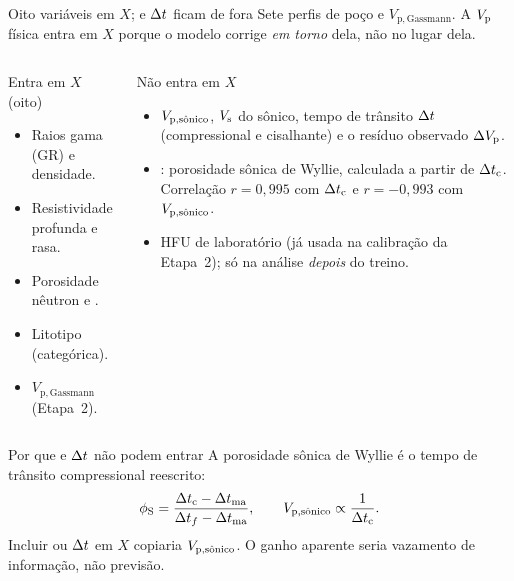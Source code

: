 \documentclass[aspectratio=169,10pt]{beamer}
\begin{document}
\begin{frame}[shrink=8]{Oito variáveis em $X$; \phiS{} e $\Dt$ ficam de fora}
  \footnotesize
  Sete perfis de poço e $V_{\mathrm{p,Gassmann}}$. A $\Vp$ física entra em $X$
  porque o modelo corrige \emph{em torno} dela, não no lugar dela.
  \vspace{0.06cm}
  \begin{columns}[T,onlytextwidth]
    \begin{block}{Entra em $X$ (oito)}
      \scriptsize
      \begin{itemize}
        \item Raios gama (GR) e densidade.
        \item Resistividade profunda e rasa.
        \item Porosidade nêutron e \phiND{}.
        \item Litotipo (categórica).
        \item $V_{\mathrm{p,Gassmann}}$ (Etapa~2).
      \end{itemize}
    \end{block}
    \begin{exampleblock}{Não entra em $X$}
      \scriptsize
      \begin{itemize}
        \item $\Vpsonsub$, $\Vs$ do sônico, tempo de trânsito $\Dt$
              (compressional e cisalhante) e o resíduo observado $\dVp$.
        \item \textbf{\phiS{}}: porosidade sônica de Wyllie, calculada a
              partir de $\Dtc$. Correlação $r = 0{,}995$ com $\Dtc$ e
              $r = -0{,}993$ com $\Vpsonsub$.
        \item HFU de laboratório (já usada na calibração da Etapa~2);
              só na análise \emph{depois} do treino.
      \end{itemize}
    \end{exampleblock}
  \end{columns}
  \vspace{0.08cm}
  \begin{block}{Por que \phiS{} e $\Dt$ não podem entrar}
    \scriptsize
    A porosidade sônica de Wyllie é o tempo de trânsito compressional
    reescrito:
    \[
      \phiS
      = \frac{\Dtc - \Delta t_{\mathrm{ma}}}{\Delta t_{f}-\Delta t_{\mathrm{ma}}},
      \qquad
      \Vpsonsub \propto \frac{1}{\Dtc}.
    \]
    Incluir \phiS{} ou $\Dt$ em $X$ copiaria $\Vpsonsub$. O ganho aparente
    seria vazamento de informação, não previsão.
  \end{block}
\end{frame}
\end{document}
